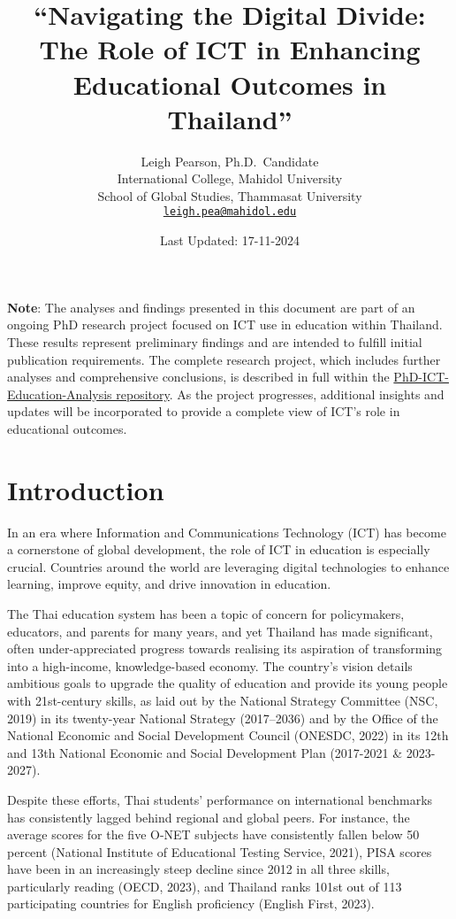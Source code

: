 \documentclass[
]{article}
\title{``Navigating the Digital Divide: The Role of ICT in Enhancing
Educational Outcomes in Thailand''}
\author{Leigh Pearson, Ph.D.~Candidate\\
International College, Mahidol University\\
School of Global Studies, Thammasat University\\
\href{mailto:leigh.pea@mahidol.edu}{\nolinkurl{leigh.pea@mahidol.edu}}}
\date{Last Updated: 17-11-2024}
\begin{document}
\maketitle

\textbf{Note}: The analyses and findings presented in this document are
part of an ongoing PhD research project focused on ICT use in education
within Thailand. These results represent preliminary findings and are
intended to fulfill initial publication requirements. The complete
research project, which includes further analyses and comprehensive
conclusions, is described in full within the
\href{https://github.com/justleigh/PhD-ICT-Education-Analysis}{PhD-ICT-Education-Analysis
repository}. As the project progresses, additional insights and updates
will be incorporated to provide a complete view of ICT's role in
educational outcomes.


\newpage
\tableofcontents

\newpage

\hypertarget{introduction}{%
\section{Introduction}\label{introduction}}

In an era where Information and Communications Technology (ICT) has
become a cornerstone of global development, the role of ICT in education
is especially crucial. Countries around the world are leveraging digital
technologies to enhance learning, improve equity, and drive innovation
in education.

The Thai education system has been a topic of concern for policymakers,
educators, and parents for many years, and yet Thailand has made
significant, often under-appreciated progress towards realising its
aspiration of transforming into a high-income, knowledge-based economy.
The country's vision details ambitious goals to upgrade the quality of
education and provide its young people with 21st-century skills, as laid
out by the National Strategy Committee (NSC, 2019) in its twenty-year
National Strategy (2017--2036) and by the Office of the National
Economic and Social Development Council (ONESDC, 2022) in its 12th and
13th National Economic and Social Development Plan (2017-2021 \&
2023-2027).

Despite these efforts, Thai students' performance on international
benchmarks has consistently lagged behind regional and global peers. For
instance, the average scores for the five O-NET subjects have
consistently fallen below 50 percent (National Institute of Educational
Testing Service, 2021), PISA scores have been in an increasingly steep
decline since 2012 in all three skills, particularly reading (OECD,
2023), and Thailand ranks 101st out of 113 participating countries for
English proficiency (English First, 2023).
\end{document}
